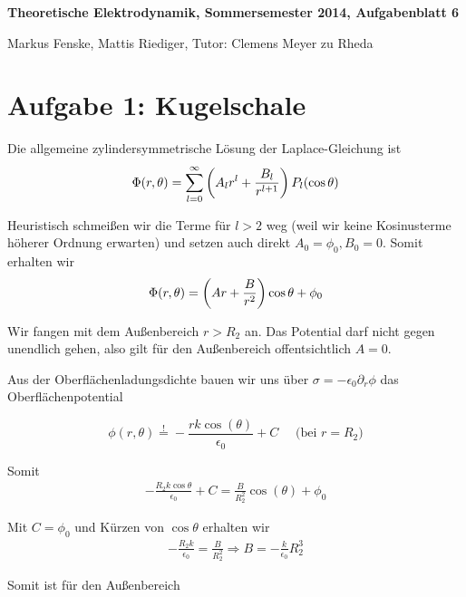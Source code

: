 \documentclass[a4paper,german,12pt,smallheadings]{scrartcl}
\begin{document}
\allowdisplaybreaks %
\begin{center}
\bfseries %
\sffamily %
\vspace{-40pt}
Theoretische Elektrodynamik, Sommersemester 2014, Aufgabenblatt 6

Markus Fenske, Mattis Riediger, Tutor: Clemens Meyer zu Rheda
\vspace{-10pt}
\end{center}

\section*{Aufgabe 1: Kugelschale}
Die allgemeine zylindersymmetrische Lösung der Laplace-Gleichung ist
\begin{equation}
  \Phi(r, \theta) = \sum_{l=0}^\infty \del{A_lr^l + \frac{B_l}{r^{l+1}}} P_l(\cos \theta)
\end{equation}

Heuristisch schmeißen wir die Terme für $l>2$ weg (weil wir keine Kosinusterme
höherer Ordnung erwarten) und setzen auch direkt $A_0 = \phi_0, B_0 = 0$. Somit
erhalten wir
\begin{equation}
  \Phi(r, \theta) = \del{Ar + \frac{B}{r^2}} \cos \theta + \phi_0
\end{equation}

Wir fangen mit dem Außenbereich $r > R_2$ an. Das Potential darf nicht gegen
unendlich gehen, also gilt für den Außenbereich offentsichtlich $A=0$.

Aus der Oberflächenladungsdichte bauen wir uns über $\sigma = - \epsilon_0
\partial_r \phi$ das Oberflächenpotential

\begin{equation}
  \phi(r, \theta) \overset{!}{=} - \frac{r k \cos(\theta)}{\epsilon_0} + C \quad\text{ (bei $r=R_2$)}
\end{equation}

Somit
\begin{align*}
  -\frac{R_2 k \cos \theta}{\epsilon_0} + C = \frac{B}{R_2^2} \cos(\theta) + \phi_0
\end{align*}

Mit $C=\phi_0$ und Kürzen von $\cos \theta$ erhalten wir
\begin{align*}
  -\frac{R_2 k}{\epsilon_0} = \frac{B}{R_2^2} \Rightarrow B = -\frac{k}{\epsilon_0} R_2^3
\end{align*}

Somit ist für den Außenbereich
\end{document}
